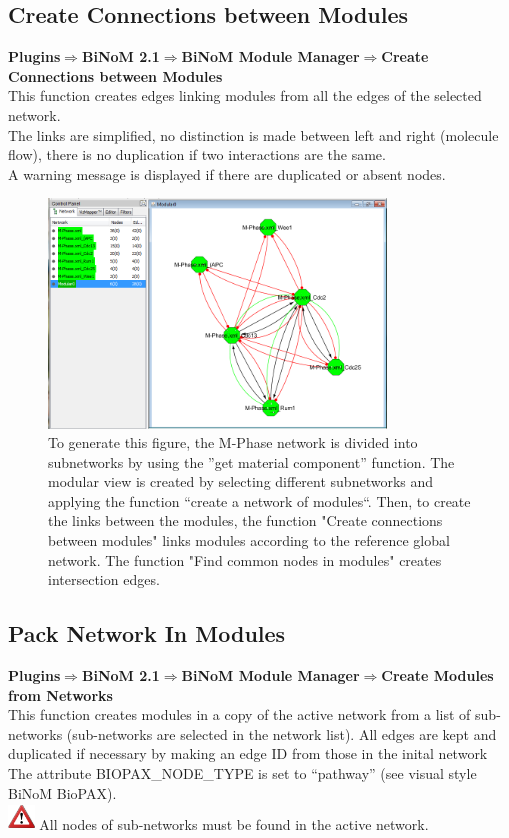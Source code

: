 \subsection{Create Connections between Modules}
\textbf{Plugins$\Rightarrow$BiNoM 2.1$\Rightarrow$BiNoM Module Manager$\Rightarrow$Create Connections between Modules}\\
This function creates edges linking modules from all the edges of the selected network.\\
The links are simplified, no distinction is made between left and right (molecule flow), there is no duplication if two interactions are the same.\\
A warning message is displayed if there are duplicated or absent nodes.

\begin{figure}
\centering
\includegraphics[width=0.8\textwidth]{graphics/M-Phase_Material_Modular}
\caption{To generate this figure, the M-Phase network is divided into
subnetworks by using the ''get material component'' function. The modular view
is created by selecting different subnetworks and applying the function ``create a network of modules``. Then, to create the links between the modules, the function "Create
connections between modules" links modules according to the reference global network. The function "Find common nodes in modules" creates intersection edges.}
\label{M-Phase_Material_Modular}
\end{figure}

\subsection{Pack Network In Modules}
\textbf{Plugins$\Rightarrow$BiNoM 2.1$\Rightarrow$BiNoM Module Manager$\Rightarrow$Create Modules from Networks}\\
This function creates modules in a copy of the active network from a list of sub-networks (sub-networks are selected in the network list). All edges are kept and duplicated if necessary by making an edge ID from those in the inital network\\
The attribute BIOPAX\_NODE\_TYPE is set to “pathway” (see visual style BiNoM BioPAX).\\
\includegraphics[width=20pt,height=20pt]{graphics/warning} All nodes of sub-networks must be found in the active network.

